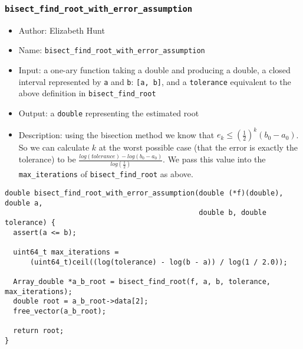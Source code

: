 \documentclass[11pt]{article}
\begin{document}
\subsubsection{\texttt{bisect\_find\_root\_with\_error\_assumption}}
\label{sec:org4b9cb72}
\begin{itemize}
\item Author: Elizabeth Hunt
\item Name: \texttt{bisect\_find\_root\_with\_error\_assumption}
\item Input: a one-ary function taking a double and producing a double, a closed interval represented
by \texttt{a} and \texttt{b}: \texttt{[a, b]}, and a \texttt{tolerance} equivalent to the above definition in \texttt{bisect\_find\_root}
\item Output: a \texttt{double} representing the estimated root
\item Description: using the bisection method we know that \(e_k \le (\frac{1}{2})^k (b_0 - a_0)\). So we can
calculate \(k\) at the worst possible case (that the error is exactly the tolerance) to be
\(\frac{log(tolerance) - log(b_0 - a_0)}{log(\frac{1}{2})}\). We pass this value into the \texttt{max\_iterations}
of \texttt{bisect\_find\_root} as above.
\end{itemize}
\begin{verbatim}
double bisect_find_root_with_error_assumption(double (*f)(double), double a,
                                              double b, double tolerance) {
  assert(a <= b);

  uint64_t max_iterations =
      (uint64_t)ceil((log(tolerance) - log(b - a)) / log(1 / 2.0));

  Array_double *a_b_root = bisect_find_root(f, a, b, tolerance, max_iterations);
  double root = a_b_root->data[2];
  free_vector(a_b_root);

  return root;
}
\end{verbatim}
\end{document}
